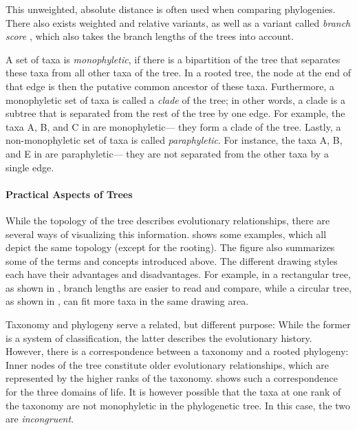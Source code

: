 This unweighted, absolute distance is often used when comparing phylogenies.
There also exists weighted and relative variants, as well as a variant called \emph{branch score} \cite{Kuhner1994},
which also takes the branch lengths of the trees into account.


A set of taxa is \emph{monophyletic},
if there is a bipartition of the tree that separates these taxa from all other taxa of the tree.
In a rooted tree, the node at the end of that edge is then the putative common ancestor of these taxa.
Furthermore, a monophyletic set of taxa is called a \emph{clade} of the tree;
in other words, a clade is a subtree that is separated from the rest of the tree by one edge.
For example, the taxa {\sffamily A}, {\sffamily B}, and {\sffamily C} in  are monophyletic---%
they form a clade of the tree.
Lastly, a non-monophyletic set of taxa is called \emph{paraphyletic}.
For instance, the taxa {\sffamily A}, {\sffamily B}, and {\sffamily E} in  are paraphyletic---%
they are not separated from the other taxa by a single edge.

\paragraph{Practical Aspects of Trees}
\label{ch:Foundations:sec:TreeOfLife:sub:PhylogeneticTrees:par:PracticalAspects}

While the topology of the tree describes evolutionary relationships,
there are several ways of visualizing this information.
 shows some examples, which all depict the same topology (except for the rooting).
The figure also summarizes some of the terms and concepts introduced above.
The different drawing styles each have their advantages and disadvantages.
For example, in a rectangular tree, as shown in ,
branch lengths are easier to read and compare,
while a circular tree, as shown in , can fit more taxa in the same drawing area.

Taxonomy and phylogeny serve a related, but different purpose:
While the former is a system of classification,
the latter describes the evolutionary history.
However, there is a correspondence between a taxonomy and a rooted phylogeny:
Inner nodes of the tree constitute older evolutionary relationships,
which are represented by the higher ranks of the taxonomy.
 shows such a correspondence for the three domains of life.
It is however possible that the taxa at one rank of the taxonomy are not monophyletic in the phylogenetic tree.
In this case, the two are \emph{incongruent}.

